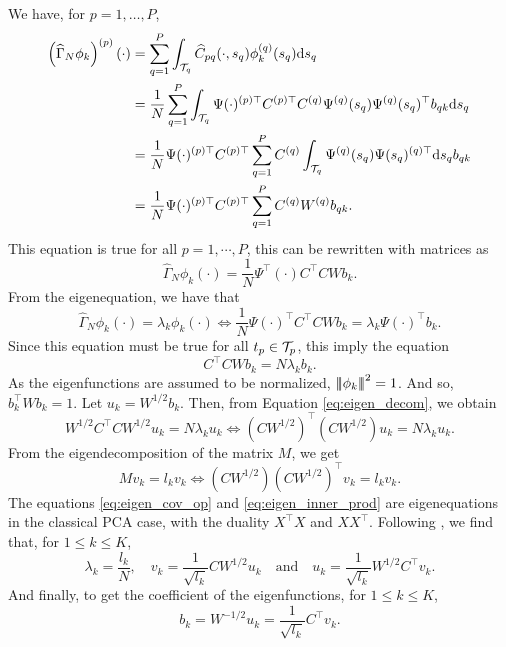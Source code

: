We have, for $p = 1, \dots, P$,
\begin{align*}
    \left(\widehat{\Gamma}_N \phi_k\right)^{(p)}(\cdot) &= \sum_{q = 1}^P \int_{\mathcal{T}_{q}} \widehat{C}_{p q}(\cdot, s_q)\phi_k^{(q)}(s_q) {\rm d} s_q \\
    &= \frac{1}{N}\sum_{q = 1}^P \int_{\mathcal{T}_{q}} \Psi(\cdot)^{(p) \top} C^{(p) \top} C^{(q)} \Psi^{(q)}(s_q) \Psi^{(q)}(s_q)^\top b_{q k} {\rm d} s_q \\
    &= \frac{1}{N} \Psi(\cdot)^{(p) \top} C^{(p) \top} \sum_{q = 1}^P C^{(q)} \int_{\mathcal{T}_{q}} \Psi^{(q)}(s_q) \Psi(s_q)^{(q) \top} {\rm d} s_q b_{q k} \\
    &= \frac{1}{N} \Psi(\cdot)^{(p) \top} C^{(p) \top} \sum_{q = 1}^P C^{(q)} W^{(q)} b_{q k}. \\
\end{align*}
This equation is true for all $p = 1, \cdots, P$, this can be rewritten with matrices as
\begin{equation}
    \widehat{\Gamma}_N \phi_k(\cdot) = \frac{1}{N}\Psi^\top(\cdot) C^\top C W b_k.
\end{equation}
From the eigenequation, we have that
\begin{equation}
    \widehat{\Gamma}_N \phi_k(\cdot) = \lambda_k \phi_k(\cdot) \Longleftrightarrow \frac{1}{N} \Psi(\cdot)^\top C^\top C W b_k = \lambda_k \Psi(\cdot)^\top b_k.
\end{equation}
Since this equation must be true for all $t_p \in \mathcal{T}_{p}$, this imply the equation
\begin{equation}\label{eq:eigen_decom}
    C^\top C W b_k = N\lambda_k b_k.
\end{equation}
As the eigenfunctions are assumed to be normalized, $\left|\!\left|\!\left|\phi_k\right|\!\right|\!\right|^2 = 1$. And so, $b_k^\top W b_k = 1$. Let $u_k = W^{1/2}b_k$. Then, from Equation \eqref{eq:eigen_decom}, we obtain
\begin{equation}\label{eq:eigen_cov_op}
    W^{1/2} C^\top C W^{1/2} u_k = N\lambda_k u_k \Longleftrightarrow \left(C W^{1/2}\right)^\top \left(C W^{1/2}\right) u_k = N\lambda_k u_k.
\end{equation}
From the eigendecomposition of the matrix $M$, we get
\begin{equation}\label{eq:eigen_inner_prod}
    Mv_k = l_k v_k \Longleftrightarrow \left(C W^{1/2}\right)\left(C W^{1/2}\right)^\top v_k = l_k v_k.
\end{equation}
The equations \eqref{eq:eigen_cov_op} and \eqref{eq:eigen_inner_prod} are eigenequations in the classical PCA case, with the duality $X^\top X$ and $XX^\top$. Following \cite{pagesMultipleFactorAnalysis2014,hardleAppliedMultivariateStatistical2019}, we find that, for $1 \leq k \leq K$,
\begin{equation}
    \lambda_k = \frac{l_k}{N}, \quad v_k = \frac{1}{\sqrt{l_k}}C W^{1/2} u_k \quad\text{and}\quad u_k = \frac{1}{\sqrt{l_k}} W^{1/2} C^\top v_k.
\end{equation}
And finally, to get the coefficient of the eigenfunctions, for $1 \leq k \leq K$,
\begin{equation}
    b_k = W^{-1/2}u_k = \frac{1}{\sqrt{l_k}} C^\top v_k.
\end{equation}

